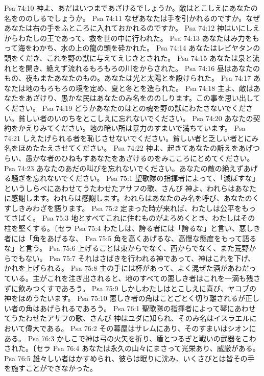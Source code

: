 Psa 74:10  神よ、あだはいつまであざけるでしょうか。敵はとこしえにあなたの名をののしるでしょうか。
Psa 74:11  なぜあなたは手を引かれるのですか。なぜあなたは右の手をふところに入れておかれるのですか。
Psa 74:12  神はいにしえからわたしの王であって、救を世の中に行われた。
Psa 74:13  あなたはみ力をもって海をわかち、水の上の龍の頭を砕かれた。
Psa 74:14  あなたはレビヤタンの頭をくだき、これを野の獣に与えてえじきとされた。
Psa 74:15  あなたは泉と流れとを開き、絶えず流れるもろもろの川をからされた。
Psa 74:16  昼はあなたのもの、夜もまたあなたのもの。あなたは光と太陽とを設けられた。
Psa 74:17  あなたは地のもろもろの境を定め、夏と冬とを造られた。
Psa 74:18  主よ、敵はあなたをあざけり、愚かな民はあなたのみ名をののしります。この事を思い出してください。
Psa 74:19  どうかあなたのはとの魂を野の獣にわたさないでください。貧しい者のいのちをとこしえに忘れないでください。
Psa 74:20  あなたの契約をかえりみてください。地の暗い所は暴力のすまいで満ちています。
Psa 74:21  しえたげられる者を恥じさせないでください。貧しい者と乏しい者とにみ名をほめたたえさせてください。
Psa 74:22  神よ、起きてあなたの訴えをあげつらい、愚かな者のひねもすあなたをあざけるのをみこころにとめてください。
Psa 74:23  あなたのあだの叫びを忘れないでください。あなたの敵の絶えずあげる騒ぎを忘れないでください。
Psa 75:1  聖歌隊の指揮者によって、「滅ぼすな」というしらべにあわせてうたわせたアサフの歌、さんび 神よ、われらはあなたに感謝します。われらは感謝します。われらはあなたのみ名を呼び、あなたのくすしきみわざを語ります。
Psa 75:2  定まった時が来れば、わたしは公平をもってさばく。
Psa 75:3  地とすべてこれに住むものがよろめくとき、わたしはその柱を堅くする。〔セラ
Psa 75:4  わたしは、誇る者には「誇るな」と言い、悪しき者には「角をあげるな、
Psa 75:5  角を高くあげるな、高慢な態度をもって語るな」と言う。
Psa 75:6  上げることは東からでなく、西からでなく、また荒野からでもない。
Psa 75:7  それはさばきを行われる神であって、神はこれを下げ、かれを上げられる。
Psa 75:8  主の手には杯があって、よく混ぜた酒があわだっている。主がこれを注ぎ出されると、地のすべての悪しき者はこれを一滴も残さずに飲みつくすであろう。
Psa 75:9  しかしわたしはとこしえに喜び、ヤコブの神をほめうたいます。
Psa 75:10  悪しき者の角はことごとく切り離されるが正しい者の角はあげられるであろう。
Psa 76:1  聖歌隊の指揮者によって琴にあわせてうたわせたアサフの歌、さんび 神はユダに知られ、そのみ名はイスラエルにおいて偉大である。
Psa 76:2  その幕屋はサレムにあり、そのすまいはシオンにある。
Psa 76:3  かしこで神は弓の火矢を折り、盾とつるぎと戦いの武器をこわされた。〔セラ
Psa 76:4  あなたは永久の山々にまさって光栄あり、威厳がある。
Psa 76:5  雄々しい者はかすめられ、彼らは眠りに沈み、いくさびとは皆その手を施すことができなかった。
